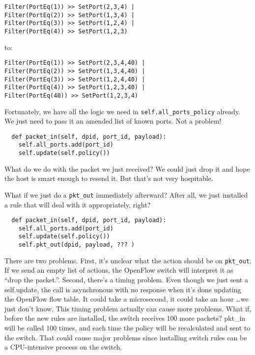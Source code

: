 \begin{verbatim}
Filter(PortEq(1)) >> SetPort(2,3,4) |
Filter(PortEq(2)) >> SetPort(1,3,4) |
Filter(PortEq(3)) >> SetPort(1,2,4) | 
Filter(PortEq(4)) >> SetPort(1,2,3)
\end{verbatim}

to:

\begin{verbatim}
Filter(PortEq(1)) >> SetPort(2,3,4,40) |
Filter(PortEq(2)) >> SetPort(1,3,4,40) |
Filter(PortEq(3)) >> SetPort(1,2,4,40) | 
Filter(PortEq(4)) >> SetPort(1,2,3,40) |
Filter(PortEq(40)) >> SetPort(1,2,3,4)
\end{verbatim}

Fortunately, we have all the logic we need in \texttt{self.all\_ports\_policy} already.  We just need
to pass it an amended list of known ports.  Not a problem!

\begin{verbatim}
  def packet_in(self, dpid, port_id, payload):
    self.all_ports.add(port_id)
    self.update(self.policy())
\end{verbatim}

What do we do with the packet we just received? 
We could just drop it and hope the host is smart enough to resend it.  But that's not
very hospitable.  

What if we just do a \texttt{pkt\_out} immediately afterward?  After all, we just installed a rule that
will deal with it appropriately, right?

\begin{verbatim}
  def packet_in(self, dpid, port_id, payload):
    self.all_ports.add(port_id)
    self.update(self.policy())
    self.pkt_out(dpid, payload, ??? )
\end{verbatim}

There are two problems.  First, it's unclear what the action should be on \texttt{pkt\_out}.  If we send an empty 
list of actions, the OpenFlow switch will interpret it as ``drop the packet.''.  
Second, there's a timing problem.
Even though we just sent a self.update, the call is asynchronous with no response when it's done updating the
OpenFlow flow table.  It could take a microsecond, it could take an hour \ldots we just don't know.  
This timing problem actually can cause more problems.  What if, before the new rules are installed, the 
switch receives 100 more packets?  pkt\_in will be called 100 times, and each time the policy will
be recalculated and sent to the switch.  That could cause major problems since installing switch rules can
be a CPU-intensive process on the switch.

